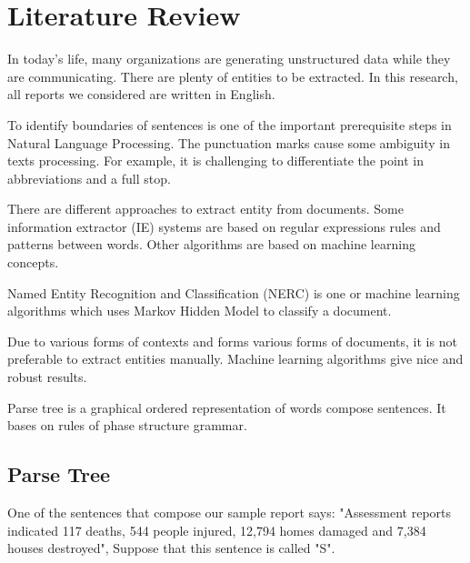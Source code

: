 \chapter{Literature Review }

In today's life, many organizations are generating unstructured data while they are communicating. There are plenty of entities to be extracted. In this research,  all reports we considered are written in English. 

To identify boundaries of sentences is one of the important prerequisite steps in Natural Language Processing. The punctuation marks cause some ambiguity  \citep{baluja2000applying} in texts processing.  For example, it is challenging to differentiate the point in abbreviations and a full stop. 

There are different approaches to extract entity from documents. Some information extractor (IE) systems are based on regular expressions rules and patterns between words. Other algorithms are based on machine learning concepts.

Named Entity Recognition  and Classification (NERC) is one or machine learning algorithms which uses  Markov Hidden Model to classify a document.

Due to various forms of contexts and forms various forms of documents, it is not preferable  to extract entities manually. Machine learning algorithms  give nice and robust results.

Parse tree is a graphical ordered representation of words compose sentences. It bases on rules of phase structure grammar. 


\section{ Parse  Tree} \label{tree}

One of the sentences that compose our sample report says: 
"Assessment reports indicated 117 deaths, 544 people injured, 12,794 homes damaged and 7,384 houses destroyed", Suppose that this sentence is called "S".

